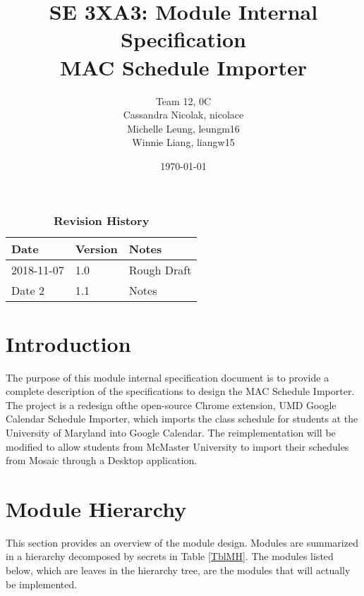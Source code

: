 \documentclass[12pt, titlepage]{article}
\title{SE 3XA3: Module Internal Specification\\MAC Schedule Importer}
\author{Team 12, 0C
		\\ Cassandra Nicolak, nicolace
		\\ Michelle Leung, leungm16
		\\ Winnie Liang, liangw15
}
\date{\today}
\newcounter{mnum}
\newcommand{\mthemnum}{M\themnum}
\begin{document}
\maketitle

\tableofcontents
\listoftables
\listoffigures

\begin{table}[bp]
\caption{\bf Revision History}
\begin{tabularx}{\textwidth}{p{3cm}p{2cm}X}
\toprule {\bf Date} & {\bf Version} & {\bf Notes}\\
\midrule
2018-11-07 & 1.0 & Rough Draft\\
Date 2 & 1.1 & Notes\\
\bottomrule
\end{tabularx}
\end{table}

\newpage


\section{Introduction}
\hspace{5mm} The purpose of this module internal specification document is to provide a complete description of the specifications to design the MAC Schedule Importer. The project is a  redesign ofthe open-source Chrome extension, UMD Google Calendar Schedule Importer, which imports the class schedule for students at the University of Maryland into Google Calendar. The reimplementation will be modified to allow students from McMaster University to import their schedules from Mosaic through a Desktop application.

\section{Module Hierarchy} \label{SecMH}

This section provides an overview of the module design. Modules are summarized
in a hierarchy decomposed by secrets in Table \ref{TblMH}. The modules listed
below, which are leaves in the hierarchy tree, are the modules that will
actually be implemented.

\end{document}
